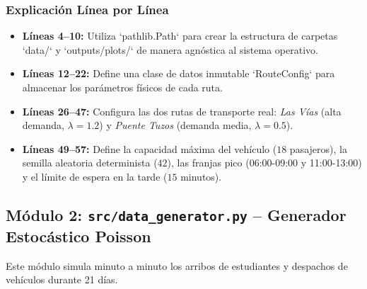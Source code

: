 \documentclass[12pt,letterpaper]{article}
\begin{document}
\subsubsection{Explicación Línea por Línea}
\begin{itemize}
	\item \textbf{Líneas 4--10:} Utiliza `pathlib.Path` para crear la estructura de carpetas `data/` y `outputs/plots/` de manera agnóstica al sistema operativo.
	\item \textbf{Líneas 12--22:} Define una clase de datos inmutable `RouteConfig` para almacenar los parámetros físicos de cada ruta.
	\item \textbf{Líneas 26--47:} Configura las dos rutas de transporte real: \textit{Las Vías} (alta demanda, $\lambda=1.2$) y \textit{Puente Tuzos} (demanda media, $\lambda=0.5$).
	\item \textbf{Líneas 49--57:} Define la capacidad máxima del vehículo ($18$ pasajeros), la semilla aleatoria determinista ($42$), las franjas pico (06:00-09:00 y 11:00-13:00) y el límite de espera en la tarde ($15$ minutos).
\end{itemize}

\subsection{Módulo 2: \texttt{src/data\_generator.py} -- Generador Estocástico Poisson}
Este módulo simula minuto a minuto los arribos de estudiantes y despachos de vehículos durante 21 días.
\end{document}

